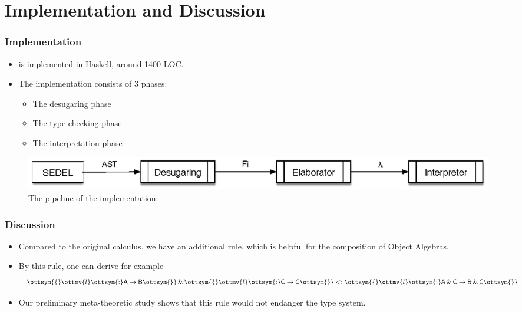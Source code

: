 \documentclass{beamer}
\begin{document}
\section{Implementation and Discussion}

\begin{frame}
  \frametitle{Implementation}

  \begin{itemize}
  \item \name is implemented in Haskell, around 1400 LOC.
  \item The implementation consists of 3 phases:
    \begin{itemize}
    \item The desugaring phase
    \item The type checking phase
    \item The interpretation phase
    \end{itemize}
  \end{itemize}

  \begin{figure}
    \centering
\includegraphics[scale=0.7]{pipeline.eps}
\caption{The pipeline of the implementation.}
  \end{figure}




\end{frame}


\begin{frame}
  \frametitle{Discussion}
  \begin{itemize}
  \item Compared to the original \bname calculus, we have an additional rule,
    which is helpful for the composition of Object Algebras.     \ottusedrule{\ottdruleSubXXR{}}
  \item By this rule, one can derive for example
    $$
    \ottsym{\{} \ottmv{l} \ottsym{:} \mathsf{A} \rightarrow \mathsf{B}
    \ottsym{\}} \,\&\, \ottsym{\{} \ottmv{l} \ottsym{:} \mathsf{C} \rightarrow
    \mathsf{C} \ottsym{\}} <: \ottsym{\{} \ottmv{l} \ottsym{:} \mathsf{A} \,\&\,
    \mathsf{C} \rightarrow \mathsf{B} \,\&\, \mathsf{C} \ottsym{\}}
    $$
  \item Our preliminary meta-theoretic study shows that this rule would not
    endanger the type system.
  \end{itemize}

\end{frame}
\end{document}
